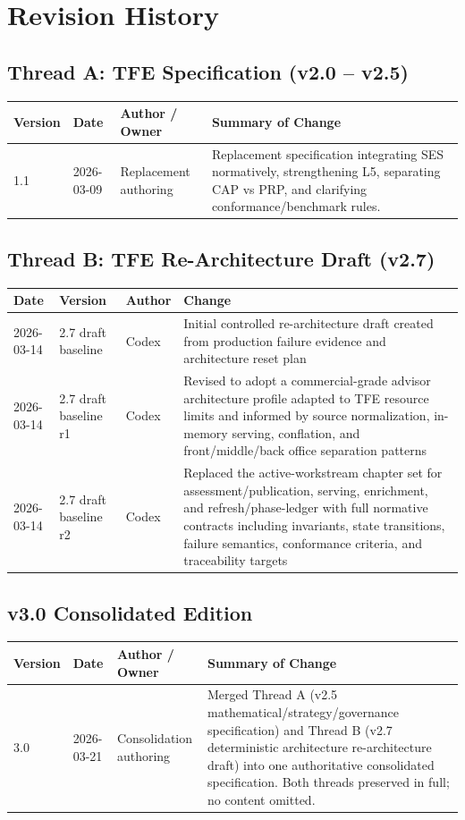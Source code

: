 \chapter{Revision History}

\section*{Thread A: TFE Specification (v2.0 -- v2.5)}
\begin{longtable}{p{}p{}p{}p{}}
\toprule
Version & Date & Author / Owner & Summary of Change \\
\midrule
1.1 & 2026-03-09 & Replacement authoring & Replacement specification integrating SES normatively, strengthening L5, separating CAP vs PRP, and clarifying conformance/benchmark rules. \\
\bottomrule
\end{longtable}

\section*{Thread B: TFE Re-Architecture Draft (v2.7)}
\begin{longtable}{|p{}|p{}|p{}|p{}|}
\hline
Date & Version & Author & Change \\\hline
2026-03-14 & 2.7 draft baseline & Codex & Initial controlled re-architecture draft created from production failure evidence and architecture reset plan \\\hline
2026-03-14 & 2.7 draft baseline r1 & Codex & Revised to adopt a commercial-grade advisor architecture profile adapted to TFE resource limits and informed by source normalization, in-memory serving, conflation, and front/middle/back office separation patterns \\\hline
2026-03-14 & 2.7 draft baseline r2 & Codex & Replaced the active-workstream chapter set for assessment/publication, serving, enrichment, and refresh/phase-ledger with full normative contracts including invariants, state transitions, failure semantics, conformance criteria, and traceability targets \\\hline
\end{longtable}

\section*{v3.0 Consolidated Edition}
\begin{longtable}{p{}p{}p{}p{}}
\toprule
Version & Date & Author / Owner & Summary of Change \\
\midrule
3.0 & 2026-03-21 & Consolidation authoring & Merged Thread A (v2.5 mathematical/strategy/governance specification) and Thread B (v2.7 deterministic architecture re-architecture draft) into one authoritative consolidated specification. Both threads preserved in full; no content omitted. \\
\bottomrule
\end{longtable}
